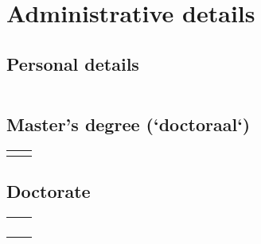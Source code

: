 \section{Administrative details}\label{sec:admdetails}


\subsection{Personal details}\label{sec:personaldetails}

\begin{center}
    \renewcommand{\arraystretch}{1.6}
    \begin{tabularx}{0.92\textwidth}{|n{5.5cm}|m{8.335cm}|}
        \hline
         & \\
        \hline
    \end{tabularx}
\end{center}


\subsection{Master's degree (`doctoraal`)}

\begin{center}
    \renewcommand{\arraystretch}{1.6}
    \begin{tabularx}{0.92\textwidth}{|n{5.5cm}|m{8.335cm}|}
        \hline
         & \\
        \hline
         & \\
        \hline
    \end{tabularx}
\end{center}


\subsection{Doctorate}

\begin{center}
    \renewcommand{\arraystretch}{1.6}
    \begin{tabularx}{0.92\textwidth}{|n{5.5cm}|m{8.335cm}|}
        \hline
         & \\
        \hline
         & \\
        \hline
         & \\
        \hline
         & \\
        \hline
         & \\
        \hline
    \end{tabularx}
\end{center}


